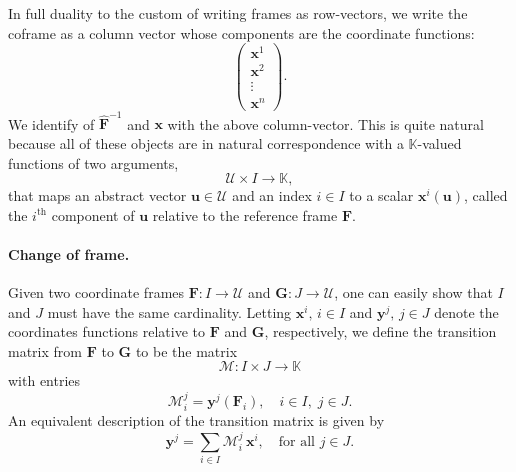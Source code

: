 \documentclass[12pt]{article}
\newcommand{\cU}{\mathcal{U}}
\newcommand{\bF}{\mathbf{F}}
\newcommand{\bG}{\mathbf{G}}
\newcommand{\tmat}{\mathcal{M}}
\newcommand{\hbF}{\hat{\bF}}
\newcommand{\bu}{\mathbf{u}}
\newcommand{\bx}{\mathbf{x}}
\newcommand{\by}{\mathbf{y}}
\newcommand{\kfield}{\mathbb{K}}
\newcommand{\supth}{^{\text{th}}}
\begin{document}
In full duality to the custom of writing frames as row-vectors, we
write the coframe as a column vector whose components are the
coordinate functions:
$$
\begin{pmatrix}
  \bx^1\\ \bx^2\\ \vdots \\ \bx^n
\end{pmatrix}.
$$
We identify of $\hbF^{-1}$ and $\bx$ with the above column-vector.
This is quite natural because all of these objects are in natural
correspondence with a $\kfield$-valued functions of two arguments,
$$\cU\times I \rightarrow \kfield,$$
that maps an abstract vector
$\bu\in \cU$ and an index $i\in I$ to a scalar $\bx^i(\bu)$, called
the $i\supth$ component of $\bu$ relative to the reference frame
$\bF$.
\paragraph{Change of frame.}
Given two coordinate frames $\bF:I\rightarrow \cU$ and
$\bG:J\rightarrow \cU$, one can easily show that $I$ and $J$ must
have the same cardinality.  Letting $\bx^i,\,i\in I$ and $\by^j,\,j\in
J$ denote the coordinates functions relative to $\bF$ and $\bG$,
respectively, we define the transition matrix from $\bF$ to $\bG$ to
be the matrix  
$$\tmat:I\times J\rightarrow \kfield$$
with entries
$$\tmat^j_i = \by^j(\bF_i),\quad i\in I,\; j\in J.$$
An equivalent description of the transition matrix is given by
$$
\by^j = \sum_{i\in I} \tmat^j_i\, \bx^i,\quad \mbox{for all }j\in J.
$$
\end{document}
